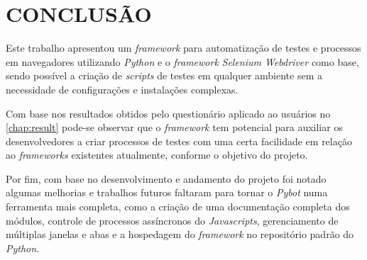 %
%

\chapter{CONCLUSÃO}\label{chap:conclusao}


    Este trabalho apresentou um \textit{framework} para automatização de testes e processos em navegadores utilizando \textit{Python} e o \textit{framework} \textit{Selenium Webdriver}
    como base, sendo possível a criação de \textit{scripts} de testes em qualquer ambiente sem a necessidade de configurações e instalações complexas.

    Com base nos resultados obtidos pelo questionário aplicado ao usuários no \autoref{chap:result} pode-se observar que o \textit{framework} tem potencial
    para auxiliar os desenvolvedores a criar processos de testes com uma certa facilidade em relação ao \textit{frameworks} existentes atualmente,
    conforme o objetivo do projeto.

    Por fim, com base no desenvolvimento e andamento do projeto foi notado algumas melhorias e trabalhos futuros faltaram para tornar o \textit{Pybot} numa ferramenta
    mais completa, como a criação de uma documentação completa dos módulos, controle de processos assíncronos do \textit{Javascripts}, gerenciamento de múltiplas
    janelas e abas e a hospedagem do \textit{framework} no repositório padrão do \textit{Python}.
